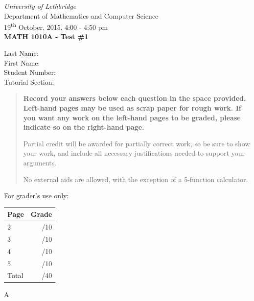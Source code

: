 \documentclass[12pt]{article}
\newcommand{\skipline}{\vspace{12pt}}
\begin{document}
\author{Instructor: Sean Fitzpatrick}
\thispagestyle{plain}
\begin{center}
\emph{University of Lethbridge}\\
Department of Mathematics and Computer Science\\
19\textsuperscript{th} October, 2015, 4:00 - 4:50 pm\\
{\bf MATH 1010A - Test \#1}\\
\end{center}
\skipline \skipline \skipline \noindent \skipline
Last Name:\underline{\hspace{353pt}}\\
\skipline
First Name:\underline{\hspace{350pt}}\\
\skipline
Student Number:\underline{\hspace{323pt}}\\
\skipline
Tutorial Section: \underline{\hspace{320pt}}\\


\vspace{0.5in}


\begin{quote}
 {\bf Record your answers below each question in the space provided.    Left-hand pages may be used as scrap paper for rough work.  If you want any work on the left-hand pages to be graded, please indicate so on the right-hand page.
 
 \bigskip
 
Partial credit will be awarded for partially correct work, so be sure to show your work, and include all necessary justifications needed to support your arguments.

\bigskip

No external aids are allowed, with the exception of a 5-function calculator.}
\end{quote}


\vspace{0.5in}

For grader's use only:

\begin{table}[hbt]
\begin{center}
\begin{tabular}{|l|r|} \hline
Page&Grade\\
\hline \hline
\cline{1-2} 2 & \enspace\enspace\enspace\enspace\enspace\enspace/10\\
\cline{1-2} 3 & \enspace\enspace\enspace\enspace\enspace\enspace/10\\
\cline{1-2} 4 & \enspace\enspace\enspace\enspace\enspace\enspace/10\\
\cline{1-2} 5 & \enspace\enspace\enspace\enspace\enspace\enspace/10\\
\cline{1-2} Total & \enspace\enspace\enspace\enspace\enspace\enspace/40\\
\hline
\end{tabular}

\skipline

\skipline

\skipline

A
\end{center}
\end{table}
\newpage
\end{document}
